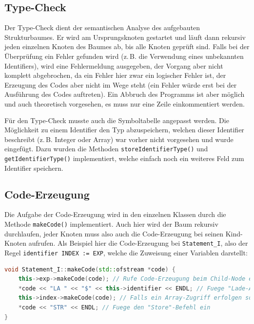 \documentclass[listof=totoc,DIV11,a4paper]{scrreprt}
\begin{document}
\subsection{Type-Check}
Der Type-Check dient der semantischen Analyse des aufgebauten Strukturbaumes. Er wird am Ursprungsknoten gestartet und läuft dann rekursiv jeden einzelnen Knoten des Baumes ab, bis alle Knoten geprüft sind. Falls bei der Überprüfung ein Fehler gefunden wird (z.\,B. die Verwendung eines unbekannten Identifiers), wird eine Fehlermeldung ausgegeben, der Vorgang aber nicht komplett abgebrochen, da ein Fehler hier zwar ein logischer Fehler ist, der Erzeugung des Codes aber nicht im Wege steht (ein Fehler würde erst bei der Ausführung des Codes auftreten). Ein Abbruch des Programms ist aber möglich und auch theoretisch vorgesehen, es muss nur eine Zeile einkommentiert werden.

Für den Type-Check musste auch die Symboltabelle angepasst werden. Die Möglichkeit zu einem Identifier den Typ abzuspeichern, welchen dieser Identifier beschreibt (z.\,B. Integer oder Array) war vorher nicht vorgesehen und wurde eingefügt. Dazu wurden die Methoden \verb+storeIdentifierType()+ und \verb+getIdentifierType()+ implementiert, welche einfach noch ein weiteres Feld zum Identifier speichern.

\subsection{Code-Erzeugung}
Die Aufgabe der Code-Erzeugung wird in den einzelnen Klassen durch die Methode \verb+makeCode()+ implementiert. Auch hier wird der Baum rekursiv durchlaufen, jeder Knoten muss also auch die Code-Erzeugung bei seinen Kind-Knoten aufrufen. Als Beispiel hier die Code-Erzeugung bei \verb+Statement_I+, also der Regel \verb+identifier INDEX := EXP+, welche die Zuweisung einer Variablen darstellt:

\begin{lstlisting}[language=C++,label=lst:makecodestatementi,caption=Parser: Code-Erzeugung des Zuweisung-Statements]
void Statement_I::makeCode(std::ofstream *code) {
    this->exp->makeCode(code); // Rufe Code-Erzeugung beim Child-Node exp auf
    *code << "LA " << "$" << this->identifier << ENDL; // Fuege "Lade-Adresse" des Identifiers ein
    this->index->makeCode(code); // Falls ein Array-Zugriff erfolgen soll, fuege diesen Zugriff ein
    *code << "STR" << ENDL; // Fuege den "Store"-Befehl ein
}
\end{lstlisting}
\end{document}
